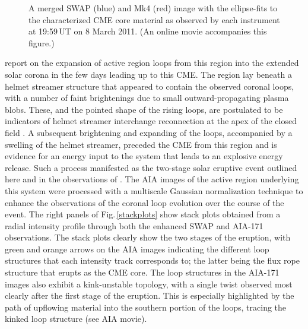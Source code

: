 \documentclass[namedreferences]{solarphysics}
\begin{document}
\begin{article}
\begin{figure}[t]
\caption{A merged SWAP (blue) and Mk4 (red) image with the ellipse-fits to the characterized CME core material as observed by each instrument at 19:59\,UT on 8 March 2011. (An online movie accompanies this figure.)}
\label{combined}
\end{figure}

 report on the expansion of active region loops from this region into the extended solar corona in the few days leading up to this CME. The region lay beneath a helmet streamer structure that appeared to contain the observed coronal loops, with a number of faint brightenings due to small outward-propagating plasma blobs. These, and the pointed shape of the rising loops, are postulated to be indicators of helmet streamer interchange reconnection at the apex of the closed field \cite{2012ApJ...749..182W}. A subsequent brightening and expanding of the loops, accompanied by a swelling of the helmet streamer, preceded the CME from this region and is evidence for an energy input to the system that leads to an explosive energy release. Such a process manifested as the two-stage solar eruptive event outlined here and in the observations of . The AIA images of the active region underlying this system were processed with a multiscale Gaussian normalization technique \cite{MorganDruckmuller_inreview} to enhance the observations of the coronal loop evolution over the course of the event. The right panels of Fig.\,\ref{stackplots} show stack plots obtained from a radial intensity profile through both the enhanced SWAP and AIA-171 observations. The stack plots clearly show the two stages of the eruption, with green and orange arrows on the AIA images indicating the different loop structures that each intensity track corresponds to; the latter being the flux rope structure that erupts as the CME core. The loop structures in the AIA-171 images also exhibit a kink-unstable topology, with a single twist observed most clearly after the first stage of the eruption. This is especially highlighted by the path of upflowing material into the southern portion of the loops, tracing the kinked loop structure (see AIA movie).	 


\end{article}
\end{document}
